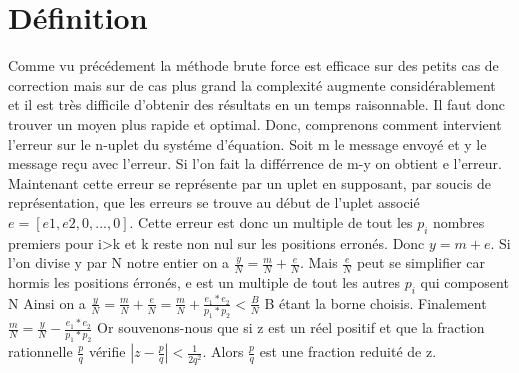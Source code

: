 \documentclass[a4paper, 11pt]{report}
\begin{document}
\section{Définition}
Comme vu précédement la méthode brute force est efficace sur des petits cas de 
correction mais sur de cas plus grand la complexité augmente considérablement et il est très difficile d'obtenir des résultats en un temps raisonnable.\newline
Il faut donc trouver un moyen plus rapide et optimal. Donc, comprenons comment intervient l'erreur sur le n-uplet du systéme d'équation.\newline
Soit m le message envoyé et y le message reçu avec l'erreur. Si l'on fait la différrence de m-y on obtient e l'erreur.
Maintenant cette erreur se représente par un uplet en supposant, par soucis de représentation, que les erreurs se trouve au début de l'uplet associé
$e = [e1,e2,0,...,0]$. Cette erreur est donc un multiple de tout les $p_i$ nombres premiers pour i>k et k  reste non nul sur les positions erronés.\newline
Donc $y = m + e$. Si l'on divise y par N notre entier on a $\frac{y}{N}=\frac{m}{N}+\frac{e}{N}$.\newline
Mais $\frac{e}{N}$ peut se simplifier car hormis les positions érronés, e est un multiple de tout les autres $p_i$ qui composent N\newline
Ainsi on a  $\frac{y}{N}=\frac{m}{N}+\frac{e}{N}=\frac{m}{N}+ \frac{e_1 * e_2}{p_1 * p_2 } <\frac{B}{N} $ B étant la borne choisis.\newline
Finalement $\frac{m}{N}=\frac{y}{N} - \frac{e_1 * e_2}{p_1 * p_2 } $ \newline
\newline
Or souvenons-nous que si z est un réel positif et que la fraction rationnelle $\frac{p}{q}$
vérifie $ \left| z - \frac{p}{q} \right| < \frac{1}{2q^2} $. 
Alors $\frac{p}{q}$ est une fraction reduité de z.\newline
\newline
\end{document}
